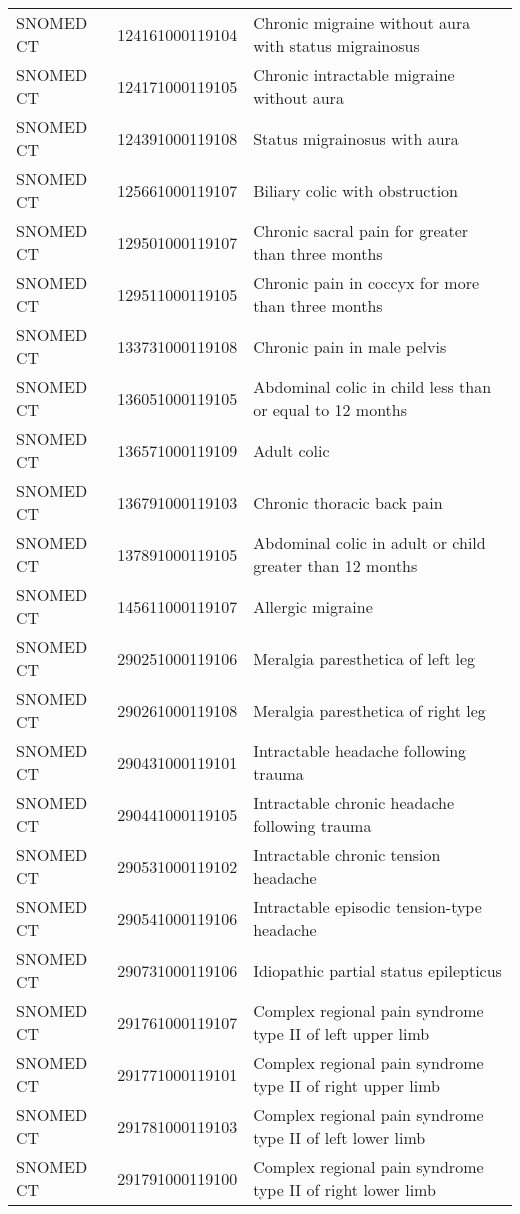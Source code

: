 \begin{longtable}{p{}p{}p{}}
  SNOMED CT & 124161000119104 & Chronic migraine without aura with status migrainosus \\ 
  SNOMED CT & 124171000119105 & Chronic intractable migraine without aura \\ 
  SNOMED CT & 124391000119108 & Status migrainosus with aura \\ 
  SNOMED CT & 125661000119107 & Biliary colic with obstruction \\ 
  SNOMED CT & 129501000119107 & Chronic sacral pain for greater than three months \\ 
  SNOMED CT & 129511000119105 & Chronic pain in coccyx for more than three months \\ 
  SNOMED CT & 133731000119108 & Chronic pain in male pelvis \\ 
  SNOMED CT & 136051000119105 & Abdominal colic in child less than or equal to 12 months \\ 
  SNOMED CT & 136571000119109 & Adult colic \\ 
  SNOMED CT & 136791000119103 & Chronic thoracic back pain \\ 
  SNOMED CT & 137891000119105 & Abdominal colic in adult or child greater than 12 months \\ 
  SNOMED CT & 145611000119107 & Allergic migraine \\ 
  SNOMED CT & 290251000119106 & Meralgia paresthetica of left leg \\ 
  SNOMED CT & 290261000119108 & Meralgia paresthetica of right leg \\ 
  SNOMED CT & 290431000119101 & Intractable headache following trauma \\ 
  SNOMED CT & 290441000119105 & Intractable chronic headache following trauma \\ 
  SNOMED CT & 290531000119102 & Intractable chronic tension headache \\ 
  SNOMED CT & 290541000119106 & Intractable episodic tension-type headache \\ 
  SNOMED CT & 290731000119106 & Idiopathic partial status epilepticus \\ 
  SNOMED CT & 291761000119107 & Complex regional pain syndrome type II of left upper limb \\ 
  SNOMED CT & 291771000119101 & Complex regional pain syndrome type II of right upper limb \\ 
  SNOMED CT & 291781000119103 & Complex regional pain syndrome type II of left lower limb \\ 
  SNOMED CT & 291791000119100 & Complex regional pain syndrome type II of right lower limb \\ 

\end{longtable}
